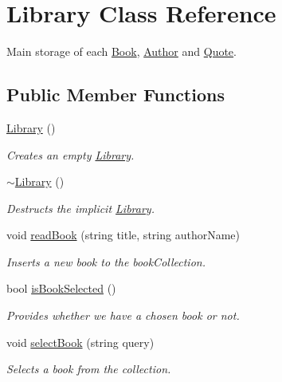 \hypertarget{class_library}{}\section{Library Class Reference}
\label{class_library}


Main storage of each \hyperlink{class_book}{Book}, \hyperlink{class_author}{Author} and \hyperlink{class_quote}{Quote}.  


\subsection*{Public Member Functions}
\begin{DoxyCompactItemize}
\item 
\hyperlink{class_library_a82338219d8bf51962ff5f60a0db21b19}{Library} ()
\begin{DoxyCompactList}\small\item\em Creates an empty \hyperlink{class_library}{Library}. \end{DoxyCompactList}\item 
\hyperlink{class_library_a62120f28a9b50cc5b151d868e42ab936}{$\sim$\+Library} ()
\begin{DoxyCompactList}\small\item\em Destructs the implicit \hyperlink{class_library}{Library}. \end{DoxyCompactList}\item 
void \hyperlink{class_library_a2e296d2dc8e0292f0ea6d8d3511f7ec5}{read\+Book} (string title, string author\+Name)
\begin{DoxyCompactList}\small\item\em Inserts a new book to the book\+Collection. \end{DoxyCompactList}\item 
bool \hyperlink{class_library_a04ff0757054c2813e89036cdd3f7f91f}{is\+Book\+Selected} ()
\begin{DoxyCompactList}\small\item\em Provides whether we have a chosen book or not. \end{DoxyCompactList}\item 
void \hyperlink{class_library_a6dd541a183a89a4d35a80834ed9d8d71}{select\+Book} (string query)
\begin{DoxyCompactList}\small\item\em Selects a book from the collection. \end{DoxyCompactList}\item 

\end{DoxyCompactItemize}
